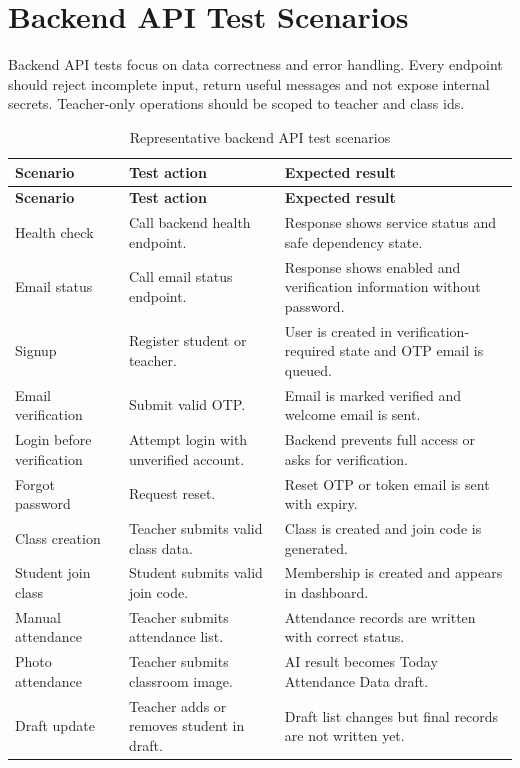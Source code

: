 \section{Backend API Test Scenarios}

Backend API tests focus on data correctness and error handling. Every endpoint should reject incomplete input, return useful messages and not expose internal secrets. Teacher-only operations should be scoped to teacher and class ids.

\begin{longtable}{p{3.3cm} p{4.4cm} p{5.8cm}}
\caption{Representative backend API test scenarios}
\label{tab:backend-test-scenarios}\\
\toprule
\textbf{Scenario} & \textbf{Test action} & \textbf{Expected result}\\
\midrule
\endfirsthead
\toprule
\textbf{Scenario} & \textbf{Test action} & \textbf{Expected result}\\
\midrule
\endhead
Health check & Call backend health endpoint. & Response shows service status and safe dependency state.\\
Email status & Call email status endpoint. & Response shows enabled and verification information without password.\\
Signup & Register student or teacher. & User is created in verification-required state and OTP email is queued.\\
Email verification & Submit valid OTP. & Email is marked verified and welcome email is sent.\\
Login before verification & Attempt login with unverified account. & Backend prevents full access or asks for verification.\\
Forgot password & Request reset. & Reset OTP or token email is sent with expiry.\\
Class creation & Teacher submits valid class data. & Class is created and join code is generated.\\
Student join class & Student submits valid join code. & Membership is created and appears in dashboard.\\
Manual attendance & Teacher submits attendance list. & Attendance records are written with correct status.\\
Photo attendance & Teacher submits classroom image. & AI result becomes Today Attendance Data draft.\\
Draft update & Teacher adds or removes student in draft. & Draft list changes but final records are not written yet.\\

\end{longtable}
